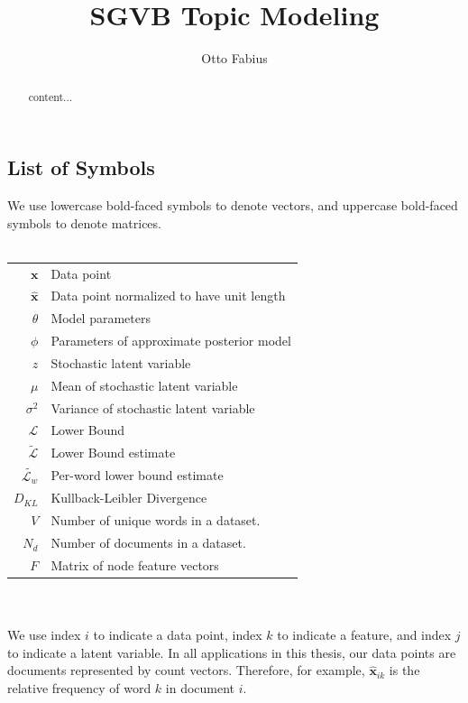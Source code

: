 \documentclass{report}
\author{Otto Fabius}
\title{SGVB Topic Modeling}
\begin{document}
\large
\doublespacing
\maketitle

\begin{abstract}
	content...
\end{abstract}
\chapter*{}
\onehalfspacing
\section*{List of Symbols}
We use lowercase bold-faced symbols to denote vectors, and uppercase bold-faced symbols to denote matrices. \\ \\
\begin{tabular}{r l}
	\hspace{15mm} $\mathbf{x}$ & Data point \\
	$\mathbf{\hat{x}}$ & Data point normalized to have unit length \\	
	$\theta$ &  Model parameters \\
	$\phi$ & Parameters of approximate posterior model \\
	$z$ & Stochastic latent variable\\
	$\mu$ & Mean of stochastic latent variable\\
	$\sigma ^2 $ & Variance of stochastic latent variable \\
	$\mathcal{L}$ & Lower Bound \\
	$\tilde{\mathcal{L}}$ & Lower Bound estimate\\
	$\tilde{\mathcal{L}_w}$ & Per-word lower bound estimate \\
	$D_{KL}$ & Kullback-Leibler Divergence \\
	$V$ & Number of unique words in a dataset. \\
	$N_d$ & Number of documents in a dataset. \\
	$F$ & Matrix of node feature vectors
\end{tabular}
\\ \\
 We use index $i$ to indicate a data point, index $k$ to indicate a feature, and index $j$ to indicate a latent variable. In all applications in this thesis, our data points are documents represented by count vectors. Therefore, for example, $\mathbf{\hat{x}}_{ik}$ is the relative frequency of word $k$ in document $i$.
\end{document}
